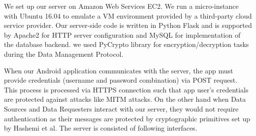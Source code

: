 We set up our server on Amazon Web Services EC2. We run a micro-instance with Ubuntu 16.04 to emulate a VM environment provided by a third-party cloud service provider. Our server-side code is written in Python Flask and is supported by Apache2 for HTTP server configuration and MySQL for implementation of the database backend. we used PyCrypto library for encryption/decryption tasks during the Data Management Protocol.

When our Android application communicates with the server, the app must provide credentials (username and password combination) via POST request. This process is processed via HTTPS connection such that app user's credentials are protected against attacks like MITM attacks. On the other hand when Data Sources and Data Requesters interact with our server, they would not require authentication as their messages are protected by cryptographic primitives set up by Hashemi et al. The server is consisted of following interfaces.

